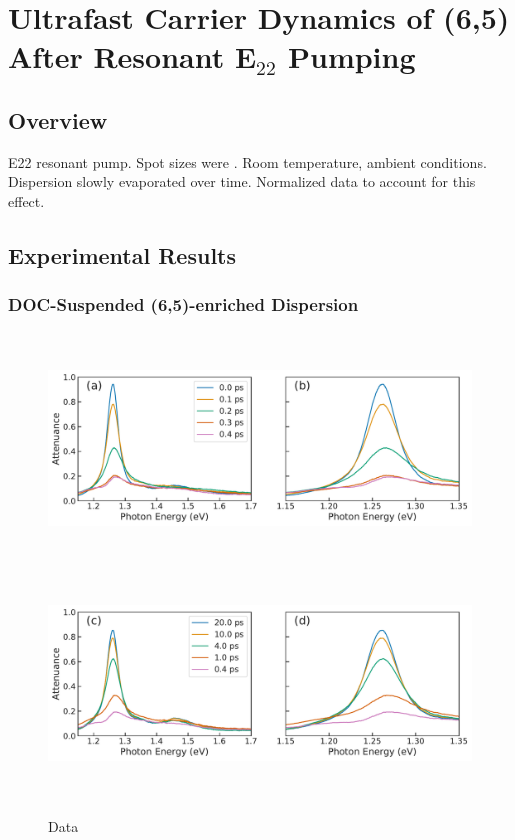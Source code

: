 \chapter{Ultrafast Carrier Dynamics of (6,5) After Resonant E$_{22}$ Pumping}

\section{Overview}

E22 resonant pump. Spot sizes were . Room temperature, ambient conditions. Dispersion slowly evaporated over time. Normalized data to account for this effect.

\section{Experimental Results}

\subsection{DOC-Suspended (6,5)-enriched Dispersion}

\begin{figure}[H]
	\centering
	{\includegraphics[height=2.4in]{images/chapter_my_data/Weilu_CNT_4mW_E11_decay} }
	{\includegraphics[height=2.4in]{images/chapter_my_data/Weilu_CNT_4mW_E11_recovery} }
	\caption{Data}
\end{figure}


